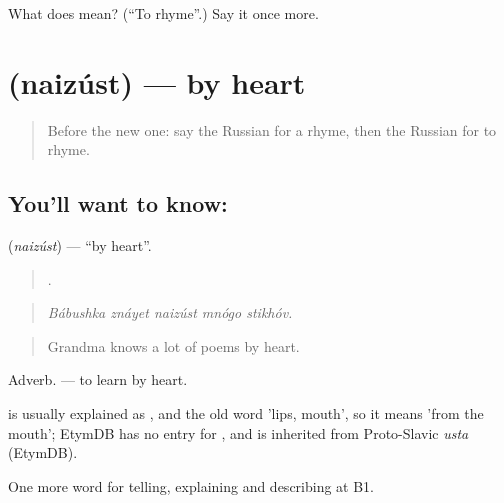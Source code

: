 \begin{tcolorbox}[breakable,colback=teal!4,colframe=teal!35!black,title={Before you move on}]
What does  mean? (\textquotedblleft{}To rhyme\textquotedblright{}.) Say it once more.
\end{tcolorbox}
\section[\texorpdfstring{\ru{наизусть} (naizúst)}{наизусть (naizúst)}]{ (naizúst) — by heart}

\label{lesson:RU-C525-naizust}



\begin{quote}
Before the new one: say the Russian for a rhyme, then the Russian for to rhyme.
\end{quote}

\subsection*{You'll want to know: }
\textbf{} (\emph{naizúst}) — \textquotedblleft{}by heart\textquotedblright{}.

\begin{quote}
    .
\end{quote}

\begin{quote}
\emph{Bábushka znáyet naizúst mnógo stikhóv.}
\end{quote}

\begin{quote}
Grandma knows a lot of poems by heart.
\end{quote}

Adverb. \emph{ } — to learn by heart.

\begin{cousinweb}
\emph{} is usually explained as \emph{}, \emph{} and the old word \emph{} 'lips, mouth', so it means 'from the mouth'; EtymDB has no entry for \emph{}, and \emph{} is inherited from Proto-Slavic \emph{usta} (EtymDB).
\end{cousinweb}

\begin{grammarlens}[title={What you've built}]
One more word for telling, explaining and describing at B1.
\end{grammarlens}

